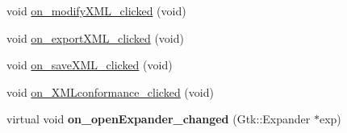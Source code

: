 \begin{DoxyCompactItemize}
void \hyperlink{classmetadataWindow_acdb85b5733ed9ca076a330041f981cd9}{on\-\_\-modify\-X\-M\-L\-\_\-clicked} (void)
\item 
void \hyperlink{classmetadataWindow_af13aa607d49190227ffe5929f2b9de06}{on\-\_\-export\-X\-M\-L\-\_\-clicked} (void)
\item 
void \hyperlink{classmetadataWindow_afc49d71e4b4465ab1723a04805800372}{on\-\_\-save\-X\-M\-L\-\_\-clicked} (void)
\item 
void \hyperlink{classmetadataWindow_a3bb9dde703d77825b33592fc0f811ae5}{on\-\_\-\-X\-M\-Lconformance\-\_\-clicked} (void)
\item 
\hypertarget{classmetadataWindow_a351de771ee76cd3c487bb9556102c452}{virtual void {\bfseries on\-\_\-open\-Expander\-\_\-changed} (Gtk\-::\-Expander $\ast$exp)}\label{classmetadataWindow_a351de771ee76cd3c487bb9556102c452}


\end{DoxyCompactItemize}
